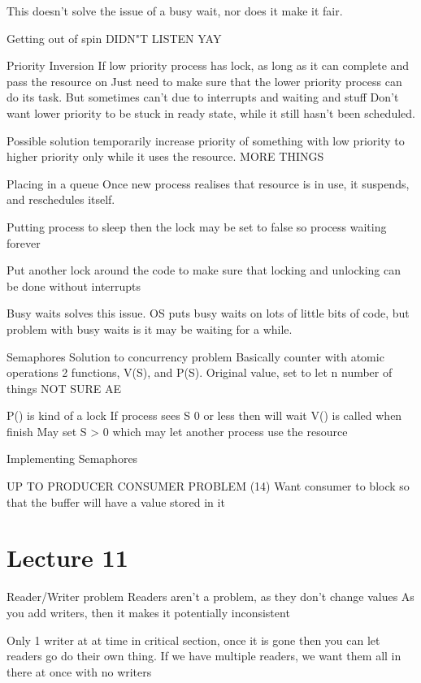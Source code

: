 \documentclass{article}
\begin{document}
		This doesn't solve the issue of a busy wait, nor does it make it fair.

	Getting out of spin
		DIDN"T LISTEN YAY

	Priority Inversion
		If low priority process has lock, as long as it can complete and pass the resource on
		Just need to make sure that the lower priority process can do its task. But sometimes can't due to interrupts and waiting and stuff
		Don't want lower priority to be stuck in ready state, while it still hasn't been scheduled.

		Possible solution
		temporarily increase priority of something with low priority to higher priority only while it uses the resource.
		MORE THINGS

	Placing in a queue
		Once new process realises that resource is in use, it suspends, and reschedules itself.

		Putting process to sleep then the lock may be set to false so process waiting forever

		Put another lock around the code to make sure that locking and unlocking can be done without interrupts

		Busy waits solves this issue. OS puts busy waits on lots of little bits of code, but problem with busy waits is it may be waiting for a while.

	Semaphores
		Solution to concurrency problem
		Basically counter with atomic operations
		2 functions, V(S), and P(S).
		Original value, set to let n number of things NOT SURE AE

		P() is kind of a lock
			If process sees S 0 or less then will wait
		V() is called when finish
			May set S > 0 which may let another process use the resource

	Implementing Semaphores

	UP TO PRODUCER CONSUMER PROBLEM
	(14)
		Want consumer to block so that the buffer will have a value stored in it



\section{Lecture 11}
	Reader/Writer problem
		Readers aren't a problem, as they don't change values
		As you add writers, then it makes it potentially inconsistent

		Only 1 writer at at time in critical section, once it is gone then you can let readers go do their own thing.
		If we have multiple readers, we want them all in there at once with no writers
\end{document}
